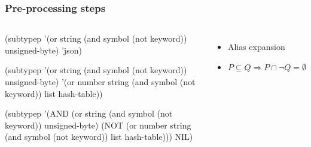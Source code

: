 \documentclass[aspectratio=169]{beamer}
\newcommand\Rarr{\ensuremath{\Rightarrow}}
\begin{document}
\begin{frame}[fragile]
  \frametitle{Pre-processing steps}
  \begin{columns}
    \begin{overprint}
\begin{clcode}
(subtypep '(or string
               (and symbol
                    (not keyword))
               unsigned-byte)
          'json)
\end{clcode}

\begin{clcode}
(subtypep '(or string
               (and symbol
                    (not keyword))
               unsigned-byte)
          '(or number
               string
               (and symbol
                    (not keyword))
               list
               hash-table))
\end{clcode}

\begin{clcode}
(subtypep
 '(AND (or string
           (and symbol
                (not keyword))
           unsigned-byte)
        (NOT (or number
                 string
                 (and symbol
                      (not keyword))
                 list
                 hash-table)))
 NIL)
\end{clcode}
    \end{overprint}

    \begin{itemize}
    \item<2-> Alias expansion
    \item<3-> $P \subseteq Q \Rarr P \cap \neg Q = \emptyset$
    \end{itemize}
  \end{columns}
\end{frame}
\end{document}

